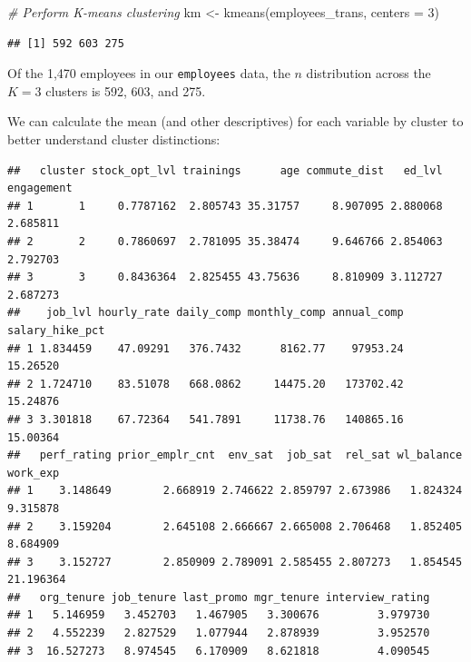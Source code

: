 \documentclass[
]{book}
\newenvironment{Shaded}{\begin{snugshade}}{\end{snugshade}}
\newcommand{\AttributeTok}[1]{\textcolor[rgb]{0.77,0.63,0.00}{#1}}
\newcommand{\CommentTok}[1]{\textcolor[rgb]{0.56,0.35,0.01}{\textit{#1}}}
\newcommand{\DecValTok}[1]{\textcolor[rgb]{0.00,0.00,0.81}{#1}}
\newcommand{\FunctionTok}[1]{\textcolor[rgb]{0.00,0.00,0.00}{#1}}
\newcommand{\NormalTok}[1]{#1}
\newcommand{\OtherTok}[1]{\textcolor[rgb]{0.56,0.35,0.01}{#1}}
\newcommand{\SpecialCharTok}[1]{\textcolor[rgb]{0.00,0.00,0.00}{#1}}
\begin{document}
\begin{Shaded}
\begin{Highlighting}[]
\CommentTok{\# Perform K{-}means clustering}
\NormalTok{km }\OtherTok{\textless{}{-}} \FunctionTok{kmeans}\NormalTok{(employees\_trans, }\AttributeTok{centers =} \DecValTok{3}\NormalTok{)}
\end{Highlighting}
\end{Shaded}

\begin{Shaded}
\end{Shaded}

\begin{verbatim}
## [1] 592 603 275
\end{verbatim}

Of the 1,470 employees in our \texttt{employees} data, the \(n\) distribution across the \(K = 3\) clusters is 592, 603, and 275.

We can calculate the mean (and other descriptives) for each variable by cluster to better understand cluster distinctions:

\begin{Shaded}
\end{Shaded}

\begin{verbatim}
##   cluster stock_opt_lvl trainings      age commute_dist   ed_lvl engagement
## 1       1     0.7787162  2.805743 35.31757     8.907095 2.880068   2.685811
## 2       2     0.7860697  2.781095 35.38474     9.646766 2.854063   2.792703
## 3       3     0.8436364  2.825455 43.75636     8.810909 3.112727   2.687273
##    job_lvl hourly_rate daily_comp monthly_comp annual_comp salary_hike_pct
## 1 1.834459    47.09291   376.7432      8162.77    97953.24        15.26520
## 2 1.724710    83.51078   668.0862     14475.20   173702.42        15.24876
## 3 3.301818    67.72364   541.7891     11738.76   140865.16        15.00364
##   perf_rating prior_emplr_cnt  env_sat  job_sat  rel_sat wl_balance  work_exp
## 1    3.148649        2.668919 2.746622 2.859797 2.673986   1.824324  9.315878
## 2    3.159204        2.645108 2.666667 2.665008 2.706468   1.852405  8.684909
## 3    3.152727        2.850909 2.789091 2.585455 2.807273   1.854545 21.196364
##   org_tenure job_tenure last_promo mgr_tenure interview_rating
## 1   5.146959   3.452703   1.467905   3.300676         3.979730
## 2   4.552239   2.827529   1.077944   2.878939         3.952570
## 3  16.527273   8.974545   6.170909   8.621818         4.090545
\end{verbatim}
\end{document}
